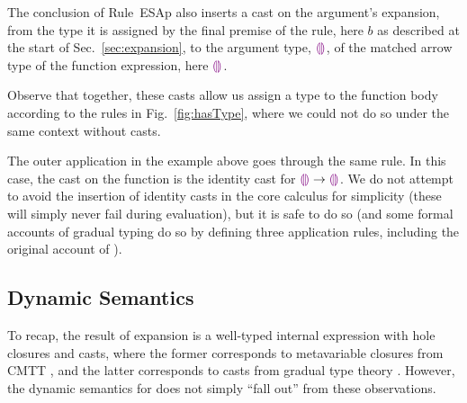 The conclusion of Rule~{ESAp} also inserts a cast on the argument's expansion, from the type it is assigned by the final premise of the rule, here $b$ as described at the start of Sec.~\ref{sec:expansion}, to the argument type, $\textcolor{violet}{\llparenthesis}\textcolor{violet}{\rrparenthesis}$, of the matched arrow type of the function expression, here $\textcolor{violet}{\llparenthesis}\textcolor{violet}{\rrparenthesis}$.

Observe that together, these casts allow us assign a type to the function body according to the rules in Fig.~\ref{fig:hasType}, where we could not do so under the same context without casts.

The outer application in the example above goes through the same rule. In this case, the cast on the function is the identity cast for $\textcolor{violet}{\llparenthesis}\textcolor{violet}{\rrparenthesis} \rightarrow \textcolor{violet}{\llparenthesis}\textcolor{violet}{\rrparenthesis}$. We do not attempt to avoid the insertion of identity casts in the core calculus for simplicity (these will simply never fail during evaluation), but it is safe to do so (and some formal accounts of gradual typing do so by defining three application rules, including the original account of \cite{Siek06a}).


\subsection{Dynamic Semantics}
\label{sec:evaluation}

To recap, the result of expansion is a well-typed internal expression with hole closures and casts, where the former corresponds to metavariable closures from CMTT \cite{Nanevski2008}, and the latter corresponds to casts from gradual type theory \cite{Siek06a,DBLP:conf/snapl/SiekVCB15}. However, the dynamic semantics for \HazelnutLive does not simply ``fall out'' from these observations. 

